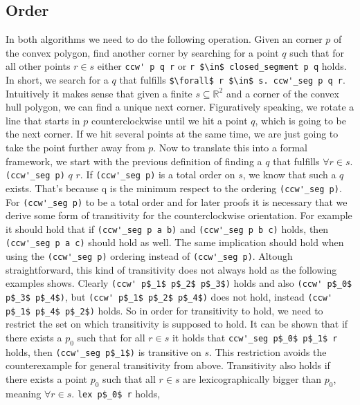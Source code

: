 \subsection{Order}
\label{sec:order}
In both algorithms we need to do the following operation. Given an corner $p$ of the convex polygon,
find another corner by searching for a point $q$ such that for all other points 
$r \in s$ either \lstinline|ccw' p q r| or \lstinline|r $\in$ closed_segment p q|
holds. In short, we search for a $q$ that fulfills  
\lstinline|$\forall$ r $\in$ s. ccw'_seg p q r|. 
Intuitively it makes sense that given a finite 
$s \subseteq \mathbb{R}^2$ and a corner of the convex hull polygon, 
we can find a unique next corner. Figuratively speaking, we rotate a line that 
starts in $p$ counterclockwise until we hit a point $q$, which is going to be the next
corner. If we hit several points at the same time, we are just going to take the point 
further away from $p$. Now to translate this into a formal framework, we start with
the previous definition of finding a $q$ that fulfills 
$\forall r \in s.$ \lstinline|(ccw'_seg p)| $q$ $r$. If \lstinline|(ccw'_seg p)| is a total
order on $s$, we know that such a $q$ exists. That's because q is the minimum
respect to the ordering \lstinline|(ccw'_seg p)|. For \lstinline|(ccw'_seg p)| to be a total order
and for later proofs it is necessary that we derive some form of transitivity for the
counterclockwise orientation. For example it should hold that if \lstinline|(ccw'_seg p a b)|
and \lstinline|(ccw'_seg p b c)| holds, then \lstinline|(ccw'_seg p a c)| should hold 
as well. The same implication should hold when using the \lstinline|(ccw'_seg p)| 
ordering instead of \lstinline|(ccw'_seg p)|. Altough straightforward, this kind of transitivity does not always
hold as the following examples shows. Clearly \lstinline|(ccw' p$_1$ p$_2$ p$_3$)| holds and also 
\lstinline|(ccw' p$_0$ p$_3$ p$_4$)|, but \lstinline|(ccw' p$_1$ p$_2$ p$_4$)| does not hold, instead 
\lstinline|(ccw' p$_1$ p$_4$ p$_2$)| holds. So in order for transitivity to hold, we need to restrict 
the set on which transitivity is supposed to hold. It can be shown that if there exists a $p_0$ such
that for all $r \in s$ it holds that \lstinline|ccw'_seg p$_0$ p$_1$ r| holds, then  
\lstinline|(ccw'_seg p$_1$)| is transitive on $s$. This restriction avoids the counterexample
for general transitivity from above. Transitivity also holds if there exists a point $p_0$ such 
that all $r \in s$ are lexicographically bigger than $p_0$, meaning $\forall r \in s.$ \lstinline|lex p$_0$ r| holds,
